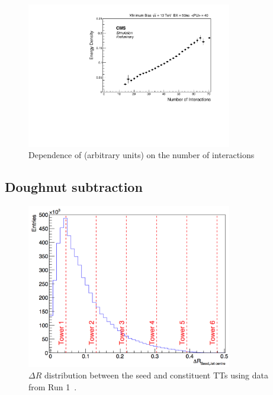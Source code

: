 \begin{figure}
\centering
    \includegraphics[width=0.8\textwidth]{./Figures/triggerUpgrade/median}
  \caption{Dependence of \rhoG (arbitrary units) on the number of interactions}
  \label{fig:medianNint}
\end{figure}  

\subsection{Doughnut subtraction}
\begin{figure}
\centering
    \includegraphics[width=0.8\textwidth]{./Figures/triggerUpgrade/deltaR2}
  \caption{$\Delta R$ distribution between the seed and constituent TTs using data from Run 1~\cite{mark-thesis}.}
  \label{fig:deltaR2}
\end{figure}  


